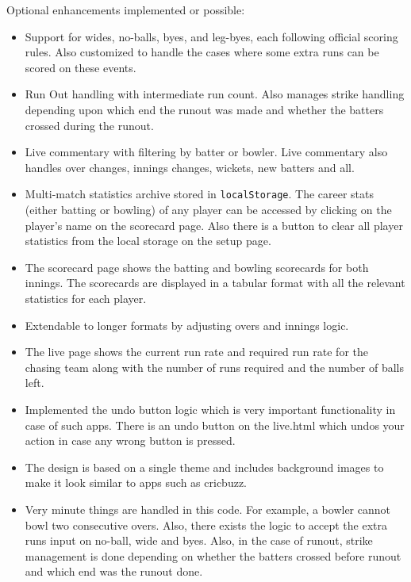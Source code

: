\documentclass[a4paper,12pt]{article}
\begin{document}
Optional enhancements implemented or possible:
\begin{itemize}
  \item Support for wides, no-balls, byes, and leg-byes, each following official scoring rules. Also customized to handle the cases where some extra runs can be scored on these events.
  \item Run Out handling with intermediate run count. Also manages strike handling depending upon which end the runout was made and whether the batters crossed during the runout.
  \item Live commentary with filtering by batter or bowler. Live commentary also handles over changes, innings changes, wickets, new batters and all.
  \item Multi-match statistics archive stored in \texttt{localStorage}. The career stats (either batting or bowling) of any player can be accessed by clicking on the player's name on the scorecard page. Also there is a button to clear all player statistics from the local storage on the setup page.
  \item The scorecard page shows the batting and bowling scorecards for both innings. The scorecards are displayed in a tabular format with all the relevant statistics for each player.
  \item Extendable to longer formats by adjusting overs and innings logic.
  \item The live page shows the current run rate and required run rate for the chasing team along with the number of runs required and the number of balls left.
  \item Implemented the undo button logic which is very important functionality in case of such apps. There is an undo button on the live.html which undos your action in case any wrong button is pressed.
  \item The design is based on a single theme and includes background images to make it look similar to apps such as cricbuzz.
  \item Very minute things are handled in this code. For example, a bowler cannot bowl two consecutive overs. Also, there exists the logic to accept the extra runs input on no-ball, wide and byes. Also, in the case of runout, strike management is done depending on whether the batters crossed before runout and which end was the runout done.
\end{itemize}

\vspace{0.5cm}
\end{document}
